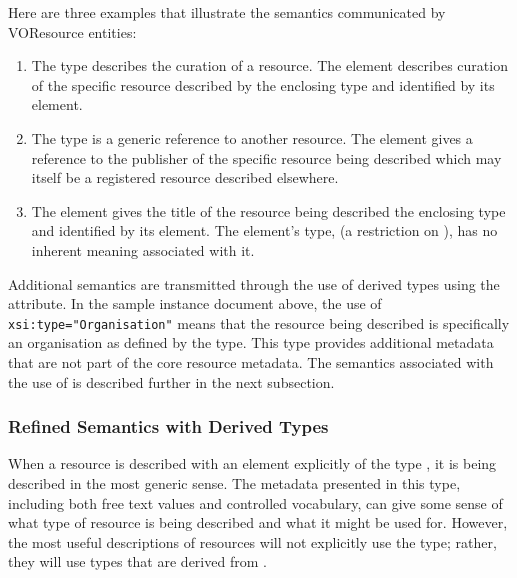 \documentclass[11pt,a4paper]{ivoa}
\begin{document}
Here are three examples that illustrate the semantics communicated by
VOResource entities:

\begin{enumerate}
\item The  type describes the curation of a
       resource.  The  element
       describes curation of the specific resource described by the
       enclosing  type and identified by its
        element. 

  \item The  type is a generic reference to
       another resource.  The  element
       gives a reference to the publisher of the specific resource being
       described which may itself be a registered resource described
       elsewhere.  

  \item The  element gives the title of
       the resource being described the enclosing
        type and identified by its
        element.  The
        element's type,
        (a restriction on
       ), has no inherent meaning associated
       with it.   
\end{enumerate}


Additional semantics are transmitted through the use of derived types
using the  attribute.  In the sample instance document
above, the use of \verb|xsi:type="Organisation"| means that the
resource being described is specifically an organisation as defined by
the  type.  This type provides additional
metadata that are not part of the core resource metadata.  The semantics
associated with the use of  is described further in the
next subsection.



\subsubsection{Refined Semantics with Derived Types}
\label{sect:derivedtypes}

When a resource is described with an element explicitly of the type
, it is being described in the most generic
sense.  The metadata presented in this type, including both free text
values and controlled vocabulary, can give some sense of what
type of resource is being described and what it might be used for.
However, the most useful descriptions of resources will not explicitly
use the  type; rather, they will use types
that are derived from .  
\end{document}

